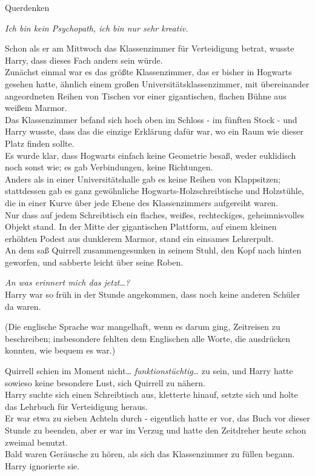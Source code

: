 

\hypertarget{querdenken}{%

Querdenken

\emph{Ich bin kein Psychopath, ich bin nur sehr kreativ.}

Schon als er am Mittwoch das Klassenzimmer für Verteidigung betrat, wusste Harry, dass dieses Fach anders sein würde.\\ Zunächst einmal war es das größte Klassenzimmer, das er bisher in Hogwarts gesehen hatte, ähnlich einem großen Universitätsklassenzimmer, mit übereinander angeordneten Reihen von Tischen vor einer gigantischen, flachen Bühne aus weißem Marmor.\\ Das Klassenzimmer befand sich hoch oben im Schloss - im fünften Stock - und Harry wusste, dass das die einzige Erklärung dafür war, wo ein Raum wie dieser Platz finden sollte.\\ Es wurde klar, dass Hogwarts einfach keine Geometrie besaß, weder euklidisch noch sonst wie; es gab Verbindungen, keine Richtungen.\\ Anders als in einer Universitätshalle gab es keine Reihen von Klappsitzen; stattdessen gab es ganz gewöhnliche Hogwarts-Holzschreibtische und Holzstühle, die in einer Kurve über jede Ebene des Klassenzimmers aufgereiht waren.\\ Nur dass auf jedem Schreibtisch ein flaches, weißes, rechteckiges, geheimnisvolles Objekt stand. In der Mitte der gigantischen Plattform, auf einem kleinen erhöhten Podest aus dunklerem Marmor, stand ein einsames Lehrerpult.\\ An dem saß Quirrell zusammengesunken in seinem Stuhl, den Kopf nach hinten geworfen, und sabberte leicht über seine Roben.

\emph{An was erinnert mich das jetzt…?}\\ Harry war so früh in der Stunde angekommen, dass noch keine anderen Schüler da waren.

(Die englische Sprache war mangelhaft, wenn es darum ging, Zeitreisen zu beschreiben; insbesondere fehlten dem Englischen alle Worte, die ausdrücken konnten, wie bequem es war.)

Quirrell schien im Moment nicht… \emph{funktionstüchtig}… zu sein, und Harry hatte sowieso keine besondere Lust, sich Quirrell zu nähern.\\ Harry suchte sich einen Schreibtisch aus, kletterte hinauf, setzte sich und holte das Lehrbuch für Verteidigung heraus.\\ Er war etwa zu sieben Achteln durch - eigentlich hatte er vor, das Buch vor dieser Stunde zu beenden, aber er war im Verzug und hatte den Zeitdreher heute schon zweimal benutzt.\\ Bald waren Geräusche zu hören, als sich das Klassenzimmer zu füllen begann. Harry ignorierte sie.

}
